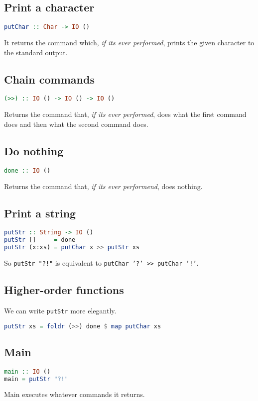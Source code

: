 \documentclass{article}
\begin{document}
\subsection{Print a character}
\begin{lstlisting}[language=haskell]
putChar :: Char -> IO ()
\end{lstlisting}
It returns the command which, \emph{if its ever performed}, prints the given character to the standard output.
\subsection{Chain commands}
\begin{lstlisting}[language=haskell]
(>>) :: IO () -> IO () -> IO ()
\end{lstlisting}
Returns the command that, \emph{if its ever performed}, does what the first command does and then what the second command does.
\subsection{Do nothing}
\begin{lstlisting}[language=haskell]
done :: IO ()
\end{lstlisting}
Returns the command that, \emph{if its ever performend}, does nothing.
\subsection{Print a string}
\begin{lstlisting}[language=haskell]
putStr :: String -> IO ()
putStr []     = done
putStr (x:xs) = putChar x >> putStr xs
\end{lstlisting}
So \texttt{putStr "?!"} is equivalent to \texttt{putChar '?' >> putChar '!'}.
\subsection{Higher-order functions}
We can write \texttt{putStr} more elegantly.
\begin{lstlisting}[language=haskell]
putStr xs = foldr (>>) done $ map putChar xs
\end{lstlisting}
\subsection{Main}
\begin{lstlisting}[language=haskell]
main :: IO ()
main = putStr "?!"
\end{lstlisting}
Main executes whatever commands it returns.
\end{document}
